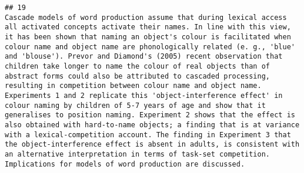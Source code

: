 \documentclass[
  english,
  man]{apa6}
\begin{document}
\begin{verbatim}
## 19                                                                                                                                                                                                                                                                                                                                                                                                                                                                                                                                                                                                                                                                                                                                                                                                                                                                                                                                                                                                                                                                                                                                                                                                                                                                                                                                                                                                                                                                                                                                                                 Cascade models of word production assume that during lexical access all activated concepts activate their names. In line with this view, it has been shown that naming an object's colour is facilitated when colour name and object name are phonologically related (e. g., 'blue' and 'blouse'). Prevor and Diamond's (2005) recent observation that children take longer to name the colour of real objects than of abstract forms could also be attributed to cascaded processing, resulting in competition between colour name and object name. Experiments 1 and 2 replicate this 'object-interference effect' in colour naming by children of 5-7 years of age and show that it generalises to position naming. Experiment 2 shows that the effect is also obtained with hard-to-name objects; a finding that is at variance with a lexical-competition account. The finding in Experiment 3 that the object-interference effect is absent in adults, is consistent with an alternative interpretation in terms of task-set competition. Implications for models of word production are discussed.

\end{verbatim}
\end{document}
